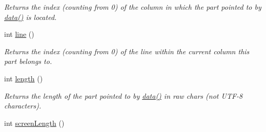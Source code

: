 \begin{DoxyCompactItemize}
\begin{DoxyCompactList}\small\item\em Returns the index (counting from 0) of the column in which the part pointed to by \hyperlink{classxmem_1_1config_1_1third__party_1_1_print_usage_implementation_1_1_line_part_iterator_a4659a652fa20c9aade9d96686ebc91d3}{data()} is located. \end{DoxyCompactList}\item 
\hypertarget{classxmem_1_1config_1_1third__party_1_1_print_usage_implementation_1_1_line_part_iterator_a085991916515dabc0c2350f981ff867e}{}int \hyperlink{classxmem_1_1config_1_1third__party_1_1_print_usage_implementation_1_1_line_part_iterator_a085991916515dabc0c2350f981ff867e}{line} ()\label{classxmem_1_1config_1_1third__party_1_1_print_usage_implementation_1_1_line_part_iterator_a085991916515dabc0c2350f981ff867e}

\begin{DoxyCompactList}\small\item\em Returns the index (counting from 0) of the line within the current column this part belongs to. \end{DoxyCompactList}\item 
\hypertarget{classxmem_1_1config_1_1third__party_1_1_print_usage_implementation_1_1_line_part_iterator_acf67bdaf6acfb4b2c68be776a5c2d04d}{}int \hyperlink{classxmem_1_1config_1_1third__party_1_1_print_usage_implementation_1_1_line_part_iterator_acf67bdaf6acfb4b2c68be776a5c2d04d}{length} ()\label{classxmem_1_1config_1_1third__party_1_1_print_usage_implementation_1_1_line_part_iterator_acf67bdaf6acfb4b2c68be776a5c2d04d}

\begin{DoxyCompactList}\small\item\em Returns the length of the part pointed to by \hyperlink{classxmem_1_1config_1_1third__party_1_1_print_usage_implementation_1_1_line_part_iterator_a4659a652fa20c9aade9d96686ebc91d3}{data()} in raw chars (not U\+T\+F-\/8 characters). \end{DoxyCompactList}\item 
\hypertarget{classxmem_1_1config_1_1third__party_1_1_print_usage_implementation_1_1_line_part_iterator_a3f14008db9127b8423662d5ed69dfd97}{}int \hyperlink{classxmem_1_1config_1_1third__party_1_1_print_usage_implementation_1_1_line_part_iterator_a3f14008db9127b8423662d5ed69dfd97}{screen\+Length} ()\label{classxmem_1_1config_1_1third__party_1_1_print_usage_implementation_1_1_line_part_iterator_a3f14008db9127b8423662d5ed69dfd97}


\end{DoxyCompactItemize}
